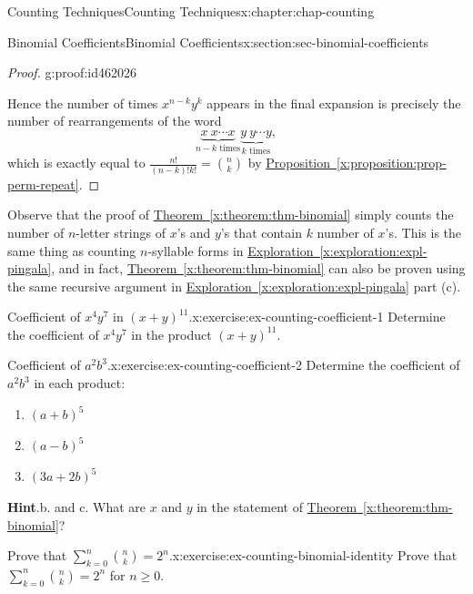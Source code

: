 \documentclass[oneside,10pt,]{book}
\newcommand{\blocktitlefont}{\relax}
\newcommand{\xreffont}{\relax}
\numberwithin{equation}{section}
\begin{document}
\begin{chapterptx}{Counting Techniques}{}{Counting Techniques}{}{}{x:chapter:chap-counting}
\begin{sectionptx}{Binomial Coefficients}{}{Binomial Coefficients}{}{}{x:section:sec-binomial-coefficients}
\begin{proof}{}{g:proof:id462026}
\par
Hence the number of times \(x^{n-k}y^k\) appears in the final expansion is precisely the number of rearrangements of the word%
\begin{equation*}
\underbrace{x\ x\cdots x}_\text{$n-k$ times}\underbrace{y\ y\cdots y}_\text{$k$ times},
\end{equation*}
which is exactly equal to \(\frac{n!}{(n-k)!k!} = \binom{n}{k}\) by \hyperref[x:proposition:prop-perm-repeat]{Proposition~{\xreffont\ref{x:proposition:prop-perm-repeat}}}.%
\end{proof}
Observe that the proof of \hyperref[x:theorem:thm-binomial]{Theorem~{\xreffont\ref{x:theorem:thm-binomial}}} simply counts the number of \(n\)-letter strings of \(x\)'s and \(y\)'s that contain \(k\) number of \(x\)'s. This is the same thing as counting \(n\)-syllable forms in \hyperref[x:exploration:expl-pingala]{Exploration~{\xreffont\ref{x:exploration:expl-pingala}}}, and in fact, \hyperref[x:theorem:thm-binomial]{Theorem~{\xreffont\ref{x:theorem:thm-binomial}}} can also be proven using the same recursive argument in \hyperref[x:exploration:expl-pingala]{Exploration~{\xreffont\ref{x:exploration:expl-pingala}}} part (c).%
\begin{inlineexercise}{Coefficient of \(x^4y^7\) in \((x+y)^{11}\).}{x:exercise:ex-counting-coefficient-1}%
Determine the coefficient of \(x^4y^7\) in the product \((x+y)^{11}\).%
\end{inlineexercise}
\begin{inlineexercise}{Coefficient of \(a^2b^3\).}{x:exercise:ex-counting-coefficient-2}%
Determine the coefficient of \(a^2b^3\) in each product:%
\begin{enumerate}[label=(\alph*)]
\item{}\(\displaystyle (a+b)^5\)%
\item{}\(\displaystyle (a-b)^5\)%
\item{}\(\displaystyle (3a+2b)^5\)%
\end{enumerate}
%
\par\smallskip%
\noindent\textbf{\blocktitlefont Hint}.\hypertarget{g:hint:id462203}{}\quad{}b. and c. What are \(x\) and \(y\) in the statement of \hyperref[x:theorem:thm-binomial]{Theorem~{\xreffont\ref{x:theorem:thm-binomial}}}?%
\end{inlineexercise}
\begin{inlineexercise}{Prove that \(\displaystyle\sum_{k=0}^n \binom{n}{k} = 2^n\).}{x:exercise:ex-counting-binomial-identity}%
Prove that \(\displaystyle\sum_{k=0}^n \binom{n}{k} = 2^n\) for \(n \geq 0\).%

\end{inlineexercise}
\end{sectionptx}
\end{chapterptx}
\end{document}
